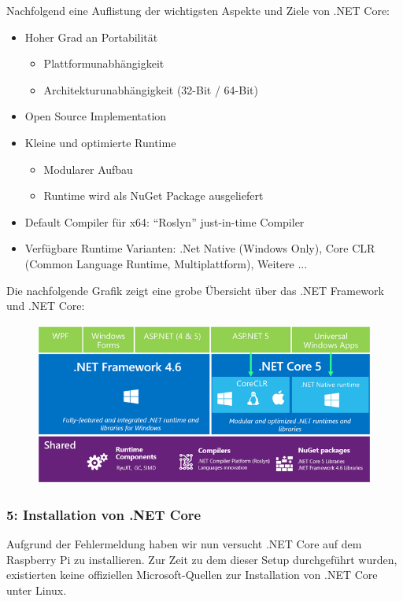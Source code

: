 Nachfolgend eine Auflistung der wichtigsten Aspekte und Ziele von .NET Core:
\begin{itemize}
\item Hoher Grad an Portabilität
\begin{itemize}
\item Plattformunabhängigkeit
\item Architekturunabhängigkeit (32-Bit / 64-Bit)
\end{itemize}
\item Open Source Implementation
\item Kleine und optimierte Runtime
\begin{itemize}
\item Modularer Aufbau
\item Runtime wird als NuGet Package ausgeliefert
\end{itemize}
\item Default Compiler für x64: "`Roslyn"' just-in-time Compiler
\item Verfügbare Runtime Varianten: .Net Native (Windows Only), Core CLR (Common Language Runtime, Multiplattform), Weitere ...
\end{itemize}

Die nachfolgende Grafik zeigt eine grobe Übersicht über das .NET Framework und .NET Core:
\begin{figure}[H]
  \centering
  \includegraphics[width=15cm]{./images/UnderstandingNetCore}
\end{figure}

\subsubsection{5: Installation von .NET Core}
Aufgrund der Fehlermeldung haben wir nun versucht .NET Core auf dem Raspberry Pi zu installieren. Zur Zeit zu dem dieser Setup durchgeführt wurden, existierten keine offiziellen Microsoft-Quellen zur Installation von .NET Core unter Linux.

